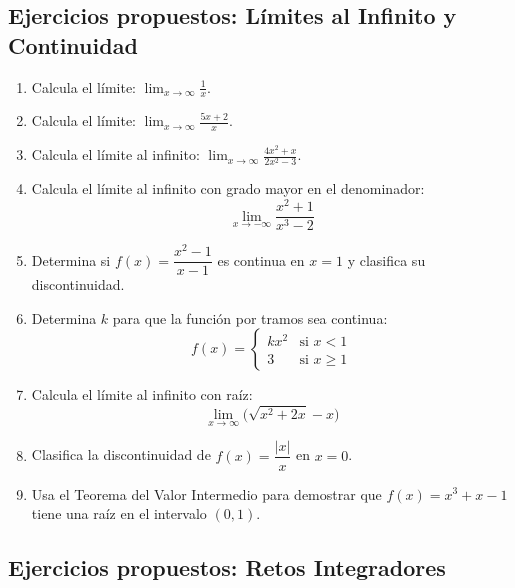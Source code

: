 \documentclass[12pt, letterpaper]{article}
\begin{document}
\subsection{Ejercicios propuestos: Límites al Infinito y Continuidad}

\begin{enumerate}[resume=ejercicios, leftmargin=*]
  \item \facil{} Calcula el límite: $\displaystyle\lim_{x \to \infty} \frac{1}{x}$.

  \item \facil{} Calcula el límite: $\displaystyle\lim_{x \to \infty} \frac{5x + 2}{x}$.

  \item \medio{} Calcula el límite al infinito: $\displaystyle\lim_{x \to \infty} \frac{4x^2 + x}{2x^2 - 3}$.

  \item \medio{} Calcula el límite al infinito con grado mayor en el denominador:
        $$\lim_{x \to -\infty} \frac{x^2 + 1}{x^3 - 2}$$

  \item \medio{} Determina si $f(x) = \dfrac{x^2 - 1}{x - 1}$ es continua en $x = 1$ y clasifica su discontinuidad.

  \item \dificil{} Determina $k$ para que la función por tramos sea continua:
        $$f(x) = \begin{cases} kx^2 & \text{si } x < 1 \\ 3 & \text{si } x \ge 1 \end{cases}$$

  \item \dificil{} Calcula el límite al infinito con raíz:
        $$\lim_{x \to \infty} \big(\sqrt{x^2 + 2x} - x\big)$$

  \item \dificil{} Clasifica la discontinuidad de $f(x) = \dfrac{|x|}{x}$ en $x = 0$.

  \item \muyDificil{} Usa el Teorema del Valor Intermedio para demostrar que $f(x) = x^3 + x - 1$ tiene una raíz en el intervalo $(0, 1)$.
\end{enumerate}

\subsection{Ejercicios propuestos: Retos Integradores}
\end{document}
